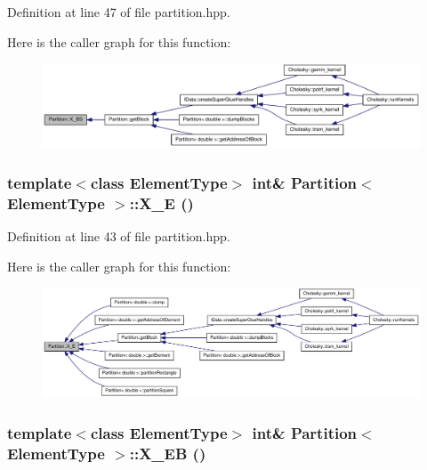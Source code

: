Definition at line 47 of file partition.hpp.

Here is the caller graph for this function:\nopagebreak
\begin{figure}[H]
\begin{center}
\leavevmode
\includegraphics[width=396pt]{class_partition_a439ac208be8dbee772f9fe167a95581b_icgraph}
\end{center}
\end{figure}
\hypertarget{class_partition_a74faab4721aa4fa4c17a23c2c7589a1a}{
\subsubsection[{X\_\-E}]{\setlength{\rightskip}{0pt plus 5cm}template$<$class ElementType$>$ int\& {\bf Partition}$<$ ElementType $>$::X\_\-E ()}}
\label{class_partition_a74faab4721aa4fa4c17a23c2c7589a1a}


Definition at line 43 of file partition.hpp.

Here is the caller graph for this function:\nopagebreak
\begin{figure}[H]
\begin{center}
\leavevmode
\includegraphics[width=420pt]{class_partition_a74faab4721aa4fa4c17a23c2c7589a1a_icgraph}
\end{center}
\end{figure}
\hypertarget{class_partition_aae132939e5651020e0801bec2009d300}{
\subsubsection[{X\_\-EB}]{\setlength{\rightskip}{0pt plus 5cm}template$<$class ElementType$>$ int\& {\bf Partition}$<$ ElementType $>$::X\_\-EB ()}}
\label{class_partition_aae132939e5651020e0801bec2009d300}


